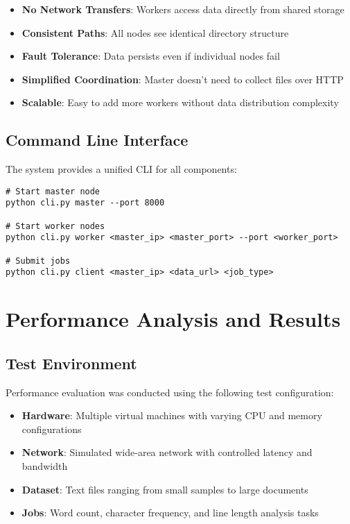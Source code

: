 \documentclass[11pt,letterpaper,oneside]{article}
\begin{document}
\begin{itemize}
    \item \textbf{No Network Transfers}: Workers access data directly from shared storage
    \item \textbf{Consistent Paths}: All nodes see identical directory structure
    \item \textbf{Fault Tolerance}: Data persists even if individual nodes fail
    \item \textbf{Simplified Coordination}: Master doesn't need to collect files over HTTP
    \item \textbf{Scalable}: Easy to add more workers without data distribution complexity
\end{itemize}

\subsection{Command Line Interface}

The system provides a unified CLI for all components:

\begin{verbatim}
# Start master node
python cli.py master --port 8000

# Start worker nodes
python cli.py worker <master_ip> <master_port> --port <worker_port>

# Submit jobs
python cli.py client <master_ip> <data_url> <job_type>
\end{verbatim}


\section{Performance Analysis and Results}

\subsection{Test Environment}

Performance evaluation was conducted using the following test configuration:

\begin{itemize}
    \item \textbf{Hardware}: Multiple virtual machines with varying CPU and memory configurations
    \item \textbf{Network}: Simulated wide-area network with controlled latency and bandwidth
    \item \textbf{Dataset}: Text files ranging from small samples to large documents
    \item \textbf{Jobs}: Word count, character frequency, and line length analysis tasks
\end{itemize}
\end{document}
